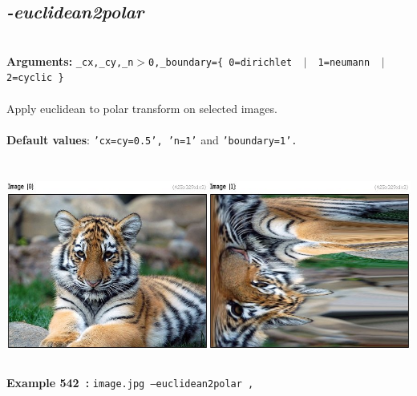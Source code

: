 \documentclass[a4paper,11pt,twoside]{book}
\begin{document}
\subsection{\emph{-euclidean2polar} }\vspace*{-0.5em}
~\\\textbf{Arguments: } 
{\small \texttt{\_cx,\_cy,\_n$>$0,\_boundary=\{ 0=dirichlet ~$|$~ 1=neumann ~$|$~ 2=cyclic \}}}\\~\\
Apply euclidean to polar transform on selected images.
~\\~\\\textbf{Default values}: {\small \texttt{'cx=cy=0.5', 'n=1'} and \texttt{'boundary=1'.}}
\begin{center}\includegraphics[keepaspectratio=true,height=7cm,width=\textwidth]{img/gmic_def542.jpg}\\
{\footnotesize \textbf{Example 542~:} \texttt{image.jpg --euclidean2polar ,}}
\end{center}
\end{document}
